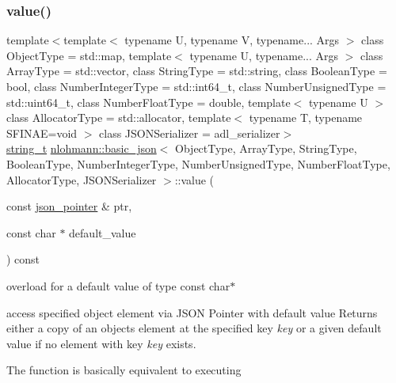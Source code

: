 \subsubsection{\texorpdfstring{value()}{value()}\hspace{0.1cm}{\footnotesize\ttfamily [4/4]}}
{\footnotesize\ttfamily template$<$template$<$ typename U, typename V, typename... Args $>$ class Object\+Type = std\+::map, template$<$ typename U, typename... Args $>$ class Array\+Type = std\+::vector, class String\+Type  = std\+::string, class Boolean\+Type  = bool, class Number\+Integer\+Type  = std\+::int64\+\_\+t, class Number\+Unsigned\+Type  = std\+::uint64\+\_\+t, class Number\+Float\+Type  = double, template$<$ typename U $>$ class Allocator\+Type = std\+::allocator, template$<$ typename T, typename S\+F\+I\+N\+A\+E=void $>$ class J\+S\+O\+N\+Serializer = adl\+\_\+serializer$>$ \\
\mbox{\hyperlink{classnlohmann_1_1basic__json_a61f8566a1a85a424c7266fb531dca005}{string\+\_\+t}} \mbox{\hyperlink{classnlohmann_1_1basic__json}{nlohmann\+::basic\+\_\+json}}$<$ Object\+Type, Array\+Type, String\+Type, Boolean\+Type, Number\+Integer\+Type, Number\+Unsigned\+Type, Number\+Float\+Type, Allocator\+Type, J\+S\+O\+N\+Serializer $>$\+::value (\begin{DoxyParamCaption}\item[{const \mbox{\hyperlink{classnlohmann_1_1basic__json_1_1json__pointer}{json\+\_\+pointer}} \&}]{ptr,  }\item[{const char $\ast$}]{default\+\_\+value }\end{DoxyParamCaption}) const\hspace{0.3cm}{\ttfamily [inline]}}



overload for a default value of type const char$\ast$ 

access specified object element via J\+S\+ON Pointer with default value Returns either a copy of an object\textquotesingle{}s element at the specified key {\itshape key} or a given default value if no element with key {\itshape key} exists.

The function is basically equivalent to executing 
\begin{DoxyCode}{0}
\DoxyCodeLine{\textcolor{keywordflow}{try} \{}
\DoxyCodeLine{\}}
\end{DoxyCode}


